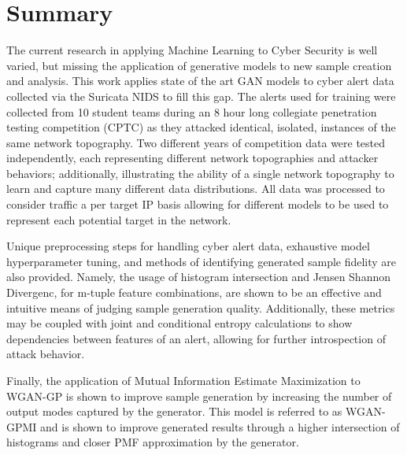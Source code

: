 \section{Summary}

The current research in applying Machine Learning to Cyber Security is well varied, but missing the application of generative models to new sample creation and analysis. This work applies state of the art GAN models to cyber alert data collected via the Suricata NIDS to fill this gap. The alerts used for training were collected from 10 student teams during an 8 hour long collegiate penetration testing competition (CPTC) as they attacked identical, isolated, instances of the same network topography. Two different years of competition data were tested independently, each representing different network topographies and attacker behaviors; additionally, illustrating the ability of a single network topography to learn and capture many different data distributions. All data was processed to consider traffic a per target IP basis allowing for different models to be used to represent each potential target in the network. 

Unique preprocessing steps for handling cyber alert data, exhaustive model hyperparameter tuning, and methods of identifying generated sample fidelity are also provided. Namely, the usage of histogram intersection and Jensen Shannon Divergenc, for m-tuple feature combinations, are shown to be an effective and intuitive means of judging sample generation quality. Additionally, these metrics may be coupled with joint and conditional entropy calculations to show dependencies between features of an alert, allowing for further introspection of attack behavior.

Finally, the application of Mutual Information Estimate Maximization to WGAN-GP is shown to improve sample generation by increasing the number of output modes captured by the generator. This model is referred to as WGAN-GPMI and is shown to improve generated results through a higher intersection of histograms and closer PMF approximation by the generator.
